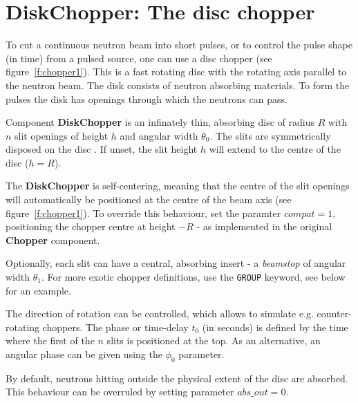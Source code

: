 
\section{DiskChopper: The disc chopper}
\label{s:chopper}


To cut a continuous neutron beam into short pulses, or to control
the pulse shape (in time) from a pulsed source, one can use a disc
chopper (see figure~\ref{f:chopper1}). This is a fast rotating disc with the
rotating axis parallel to the neutron beam. The disk consists of neutron
absorbing materials. To form the pulses the disk has openings through which
the neutrons can pass.

Component {\bf DiskChopper} is an infinately thin, absorbing disc of
radius $R$ with $n$ slit openings of height $h$ and angular width
$\theta_0$. The slits are symmetrically disposed on the disc . If
unset, the slit height $h$ will extend to the centre of the disc ($h=R$). 

The {\bf DiskChopper} is self-centering, meaning that the centre of
the slit openings will automatically be positioned at the centre of
the beam axis (see figure~\ref{f:chopper1}). To override this behaviour, set the paramter
$compat=1$, positioning the chopper centre at height $-R$ - as
implemented in the original {\bf Chopper} component.

Optionally, each slit can have a central, absorbing insert - a
\emph{beamstop} of angular width $\theta_1$. For more exotic chopper
definitions, use the \texttt{GROUP} keyword, see below for an example.

The direction of rotation can be controlled, 
which allows to simulate e.g. counter-rotating choppers. 
The phase or time-delay $t_0$ (in seconds) is defined by the time 
where the first of the $n$ slits is positioned at the top. As an
alternative, an angular phase can be given using the $\phi_0$ parameter. 

By default, neutrons hitting outside the physical extent of the disc
are absorbed. This behaviour can be overruled by setting parameter
$abs\_out=0$.


